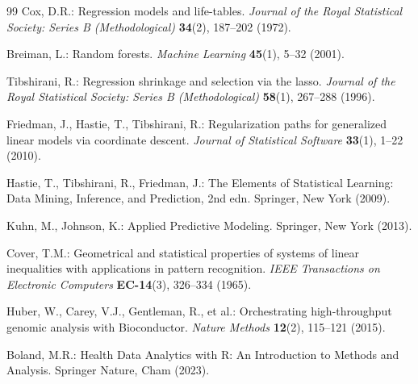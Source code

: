 \documentclass[11pt,twoside,openright]{book}
\begin{document}
\begin{thebibliography}{99}
Cox, D.R.: Regression models and life-tables.
\textit{Journal of the Royal Statistical Society: Series B (Methodological)} \textbf{34}(2), 187--202 (1972).

Breiman, L.: Random forests.
\textit{Machine Learning} \textbf{45}(1), 5--32 (2001).

Tibshirani, R.: Regression shrinkage and selection via the lasso.
\textit{Journal of the Royal Statistical Society: Series B (Methodological)} \textbf{58}(1), 267--288 (1996).

Friedman, J., Hastie, T., Tibshirani, R.: Regularization paths for generalized linear models via coordinate descent.
\textit{Journal of Statistical Software} \textbf{33}(1), 1--22 (2010).

Hastie, T., Tibshirani, R., Friedman, J.: The Elements of Statistical Learning: Data Mining, Inference, and Prediction, 2nd edn.
Springer, New York (2009).

Kuhn, M., Johnson, K.: Applied Predictive Modeling.
Springer, New York (2013).

Cover, T.M.: Geometrical and statistical properties of systems of linear inequalities with applications in pattern recognition.
\textit{IEEE Transactions on Electronic Computers} \textbf{EC-14}(3), 326--334 (1965).

Huber, W., Carey, V.J., Gentleman, R., et al.: Orchestrating high-throughput genomic analysis with Bioconductor.
\textit{Nature Methods} \textbf{12}(2), 115--121 (2015).

Boland, M.R.: Health Data Analytics with R: An Introduction to Methods and Analysis.
Springer Nature, Cham (2023).

\end{thebibliography}
\end{document}
